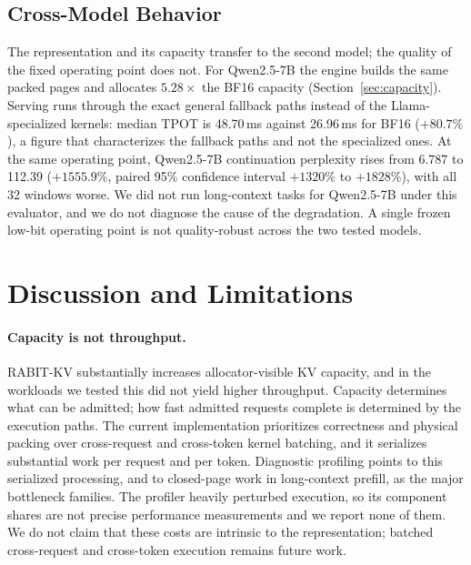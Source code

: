 \documentclass{article}
\begin{document}
\subsection{Cross-Model Behavior}
\label{sec:crossmodel}

The representation and its capacity transfer to the second model; the quality of the fixed operating
point does not. For Qwen2.5-7B the engine builds the same packed pages and allocates $5.28\times$ the
BF16 capacity (Section~\ref{sec:capacity}). Serving runs through the exact general fallback paths
instead of the Llama-specialized kernels: median TPOT is 48.70\,ms against 26.96\,ms for BF16
($+80.7\%$), a figure that characterizes the fallback paths and not the specialized ones. At the same
operating point, Qwen2.5-7B continuation perplexity rises from 6.787 to 112.39 ($+1555.9\%$, paired 95\%
confidence interval $+1320\%$ to $+1828\%$), with all 32 windows worse. We did not run long-context
tasks for Qwen2.5-7B under this evaluator, and we do not diagnose the cause of the degradation. A single
frozen low-bit operating point is not quality-robust across the two tested models.

\section{Discussion and Limitations}
\label{sec:discussion}

\paragraph{Capacity is not throughput.}
RABIT-KV substantially increases allocator-visible KV capacity, and in the workloads we tested this
did not yield higher throughput. Capacity determines what can be admitted; how fast admitted requests
complete is determined by the execution paths. The current implementation prioritizes correctness and
physical packing over cross-request and cross-token kernel batching, and it serializes substantial
work per request and per token. Diagnostic profiling points to this serialized processing, and to
closed-page work in long-context prefill, as the major bottleneck families. The profiler heavily
perturbed execution, so its component shares are not precise performance measurements and we report
none of them. We do not claim that these costs are intrinsic to the representation; batched
cross-request and cross-token execution remains future work.
\end{document}
